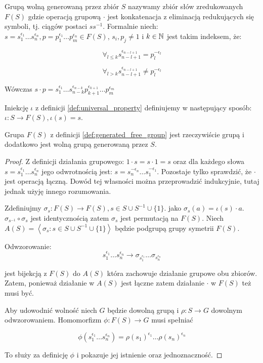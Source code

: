 \begin{defin}
  Grupą wolną generowaną przez zbiór $S$ nazywamy zbiór słów zredukowanych
  $F(S)$ gdzie operacją grupową $\cdot$ jest konkatenacja z eliminacją
  redukujących się symboli, tj. ciągów postaci $ss^{-1}$. Formalnie niech:
  $s = s_1^{\epsilon_1}\ldots s_n^{\epsilon_n}, p = p_1^{\epsilon_1}\ldots
  p_m^{\epsilon_n} \in F(S)$, $s_i, p_j \neq 1$ i $k \in \mathbb{N}$ jest takim
  indeksem, że:

  \[\forall_{l \leq k} s_{n - l + 1}^{\epsilon_{n - l + 1}} =
    p_l^{-\epsilon_l}\]

  \[\forall_{l > k} s_{n - l + 1}^{\epsilon_{n - l + 1}}
    \neq p_l^{-\epsilon_l}\]

  Wówczas $s \cdot p = s_1^{\epsilon_1}\ldots s_{n -
  k}^{\epsilon_{n-k}}p_{k+1}^{\epsilon_{k+1}}\ldots p_{m}^{\epsilon_m}$

  Iniekcję $\iota$ z definicji \ref{def:universal_property} definiujemy w
  następujący sposób: $\iota: S \rightarrow F(S), \iota(s) = s$.
  \label{def:generated_free_group}
\end{defin}

\begin{theorem}
  Grupa $F(S)$ z definicji \ref{def:generated_free_group} jest rzeczywiście grupą
  i dodatkowo jest wolną grupą generowaną przez $S$.
\end{theorem}
\begin{proof}
  Z definicji działania grupowego: $1 \cdot s = s \cdot 1 = s$ oraz 
  dla każdego słowa 
  $s = s_1^{\epsilon_1}\ldots s_n^{\epsilon_n}$ 
  jego odwrotnością jest:
  $s = s_n^{-\epsilon_n}\ldots s_1^{-\epsilon_1}$. Pozostaje tylko sprawdzić, że
  $\cdot$ jest operacją łączną. Dowód tej własności można przeprowadzić
  indukcyjnie, tutaj jednak użyję innego rozumowania.

  Zdefiniujmy $\sigma_s: F(S) \rightarrow F(S), s \in S \cup S^{-1} \cup \{1\}$.
  jako $\sigma_s(a) = \iota(s) \cdot a$. $\sigma_{s^{-1}} \circ \sigma_{s}$ jest
  identycznością zatem $\sigma_{s}$ jest permutacją na $F(S)$. Niech
  $A(S) = \left\langle \sigma_s : s \in S \cup S^{-1} \cup \{1\}\right\rangle$
  będzie podgrupą grupy symetrii $F(S)$.

  Odwzorowanie:
  \[
    s_1^{\epsilon_1} \ldots
    s_n^{\epsilon_n} \rightarrow
    \sigma_{s_1^{\epsilon_1}} \ldots
    \sigma_{s_n^{\epsilon_n}}
  \]

  jest bijekcją z $F(S)$ do $A(S)$ która zachowuje działanie grupowe obu zbiorów.
  Zatem, ponieważ działanie w $A(S)$ jest łączne zatem działanie $\cdot$ w
  $F(S)$ też musi być.

  Aby udowodnić wolność niech $G$ będzie dowolną grupą i $\rho: S \rightarrow G$
  dowolnym odwzorowaniem. Homomorfizm $\phi: F(S) \rightarrow G$ musi spełniać

  \[ \phi\left(s_1^{\epsilon_1} \ldots s_n^{\epsilon_n}\right) =
  \rho\left(s_1\right)^{\epsilon_1} \ldots \rho\left(s_n\right)^{\epsilon_n}\]

  To służy za definicję $\phi$ i pokazuje jej istnienie oraz jednoznaczność.
\end{proof}

